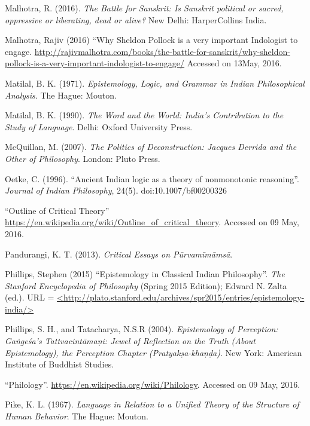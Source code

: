 \begin{thebibliography}{99}
Malhotra, R. (2016). {\sl The Battle for Sanskrit: Is Sanskrit political or sacred, oppressive or liberating, dead or alive?} New Delhi: HarperCollins India.

Malhotra, Rajiv  (2016) ``Why Sheldon Pollock is a very important Indologist to engage. \url{http://rajivmalhotra.com/books/the-battle-for-sanskrit/why-sheldon-pollock-is-a-very-important-indologist-to-engage/} Accessed on 13May, 2016.

Matilal, B. K. (1971). {\sl Epistemology, Logic, and Grammar in Indian Philosophical Analysis}. The Hague: Mouton.

Matilal, B. K. (1990). {\sl The Word and the World: India's Contribution to the Study of Language}. Delhi: Oxford University Press.

McQuillan, M. (2007). {\sl The Politics of Deconstruction: Jacques Derrida and the Other of Philosophy}. London: Pluto Press.

Oetke, C. (1996). ``Ancient Indian logic as a theory of nonmonotonic reasoning''. {\sl Journal of Indian Philosophy}, 24(5). doi:10.1007/bf00200326

``Outline of Critical Theory''  \url{https://en.wikipedia.org/wiki/Outline_of_critical_theory}. Accessed on 09 May, 2016.

Pandurangi, K. T. (2013). {\sl Critical Essays on Pūrvamīmāmsā}. 

Phillips, Stephen (2015) ``Epistemology in Classical Indian Philosophy''. {\sl The Stanford Encyclopedia of Philosophy} (Spring 2015 Edition); Edward N. Zalta (ed.). URL = \url{<http://plato.stanford.edu/archives/spr2015/entries/epistemology-india/>}

Phillips, S. H., and Tatacharya, N.S.R (2004). {\sl Epistemology of Perception: Gaṅgeśa's Tattvacintāmaṇi: Jewel of Reflection on the Truth (About Epistemology), the Perception Chapter (Pratyakṣa-khaṇḍa)}. New York: American Institute of Buddhist Studies.

``Philology''. \url{https://en.wikipedia.org/wiki/Philology}. Accessed on 09 May, 2016.

Pike, K. L. (1967). {\sl Language in Relation to a Unified Theory of the Structure of Human Behavior}. The Hague: Mouton.


\end{thebibliography}
